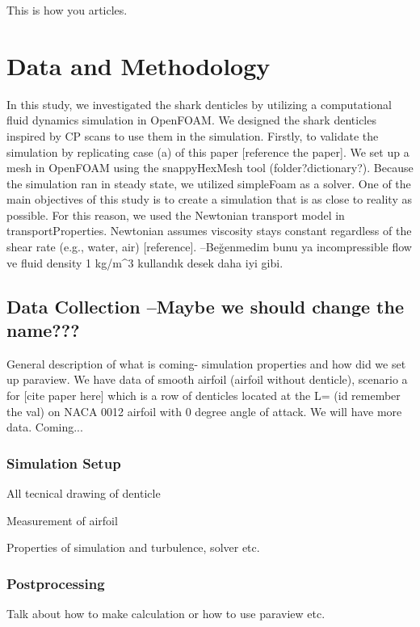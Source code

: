 \documentclass[graybox]{svmult}
\begin{document}
This is how you \cite{slavova2022edge} articles.

\section{Data and Methodology}
\label{sec:3}

In this study, we investigated the shark denticles by utilizing a computational fluid dynamics simulation in OpenFOAM. 
We designed the shark denticles inspired by CP scans to use them in the simulation. 
Firstly, to validate the simulation by replicating case (a) of this paper [reference the paper]. 
We set up a mesh in OpenFOAM using the snappyHexMesh tool (folder?dictionary?). 
Because the simulation ran in steady state, we utilized simpleFoam as a solver. 
One of the main objectives of this study is to create a simulation that is as close to reality as possible. 
For this reason, we used the Newtonian transport model in transportProperties. Newtonian assumes viscosity stays constant regardless of the shear rate (e.g., water, air) [reference]. 
–Beğenmedim bunu ya incompressible flow ve fluid density 1 kg/m^3 kullandık desek daha iyi gibi. 


\subsection{Data Collection --Maybe we should change the name???}
\label{subsec:2}

General description of what is coming- simulation properties and how did we set up paraview.
We have data of smooth airfoil (airfoil without denticle), scenario a for [cite paper here] which is a row of denticles located at the L= (id remember the val) on NACA 0012 airfoil with 0 degree angle of attack. 
We will have more data. Coming...


\subsubsection{Simulation Setup}
\label{subsec:3}
All tecnical drawing of denticle 

Measurement of airfoil 

Properties of simulation and turbulence, solver etc.


\subsubsection{Postprocessing}
\label{subsec:4}
Talk about how to make calculation or how to use paraview etc. 
\end{document}
